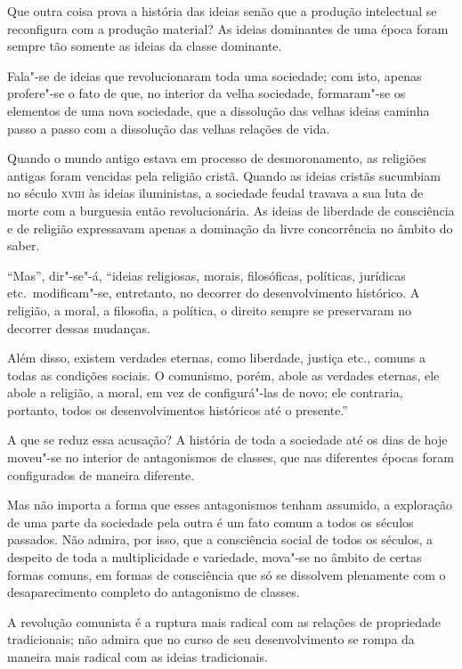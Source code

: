 Que outra coisa prova a história das ideias senão que a produção
intelectual se reconfigura com a produção material? As ideias
dominantes de uma época foram sempre tão somente as ideias da classe
dominante.

Fala"-se de ideias que revolucionaram toda uma sociedade; com isto,
apenas profere"-se o fato de que, no interior da velha sociedade,
formaram"-se os elementos de uma nova sociedade, que a dissolução das
velhas ideias caminha passo a passo com a dissolução das velhas
relações de vida.

Quando o mundo antigo estava em processo de desmoronamento, as religiões
antigas foram vencidas pela religião cristã. Quando as ideias cristãs
sucumbiam no século \textsc{xviii} às ideias iluministas, a sociedade feudal
travava a sua luta de morte com a burguesia então revolucionária. As
ideias de liberdade de consciência e de religião expressavam apenas a
dominação da livre concorrência no âmbito do saber.

``Mas'', dir"-se"-á, ``ideias religiosas, morais, filosóficas, políticas,
jurídicas etc.~modificam"-se, entretanto, no decorrer do
desenvolvimento histórico. A religião, a moral, a filosofia, a
política, o direito sempre se preservaram no decorrer dessas mudanças.

Além disso, existem verdades eternas, como liberdade, justiça etc.,
comuns a todas as condições sociais. O comunismo, porém, abole as
verdades eternas, ele abole a religião, a moral, em vez de
configurá"-las de novo; ele contraria, portanto, todos os
desenvolvimentos históricos até o presente.''

A que se reduz essa acusação? A história de toda a sociedade até os dias
de hoje moveu"-se no interior de antagonismos de classes, que nas
diferentes épocas foram configurados de maneira diferente.

Mas não importa a forma que esses antagonismos tenham assumido, a
exploração de uma parte da sociedade pela outra é um fato comum a todos
os séculos passados. Não admira, por isso, que a consciência social de
todos os séculos, a despeito de toda a multiplicidade e variedade,
mova"-se no âmbito de certas formas comuns, em formas de consciência
que só se dissolvem plenamente com o desaparecimento completo do
antagonismo de classes.

A revolução comunista é a ruptura mais radical com as relações de
propriedade tradicionais; não admira que no curso de seu
desenvolvimento se rompa da maneira mais radical com as ideias
tradicionais.

